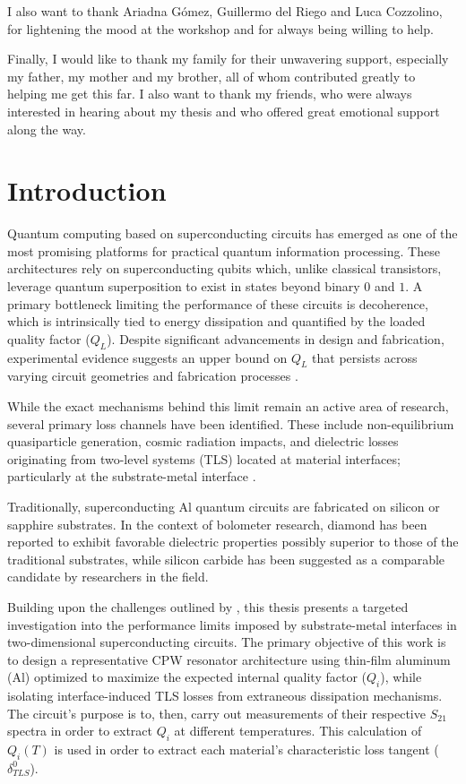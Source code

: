 \documentclass[12pt, a4paper]{article}
\begin{document}
I also want to thank Ariadna Gómez, Guillermo del Riego and Luca Cozzolino, for lightening the mood at the workshop and for always being willing to help.

Finally, I would like to thank my family for their unwavering support, especially my father, my mother and my brother, all of whom contributed greatly to helping me get this far. I also want to thank my friends, who were always interested in hearing about my thesis and who offered great emotional support along the way.

\newpage

\tableofcontents

\newpage

\section{Introduction}

Quantum computing based on superconducting circuits has emerged as one of the most promising platforms for practical quantum information processing. These architectures rely on superconducting qubits which, unlike classical transistors, leverage quantum superposition to exist in states beyond binary $0$ and $1$. A primary bottleneck limiting the performance of these circuits is decoherence, which is intrinsically tied to energy dissipation and quantified by the loaded quality factor ($Q_L$). Despite significant advancements in design and fabrication, experimental evidence suggests an upper bound on $Q_L$ that persists across varying circuit geometries and fabrication processes \cite{Charpentier2025}.

While the exact mechanisms behind this limit remain an active area of research, several primary loss channels have been identified. These include non-equilibrium quasiparticle generation, cosmic radiation impacts, and dielectric losses originating from two-level systems (TLS) located at material interfaces; particularly at the substrate-metal interface \cite{Charpentier2025}.

Traditionally, superconducting Al quantum circuits are fabricated on silicon or sapphire substrates. In the context of bolometer research, diamond has been reported to exhibit favorable dielectric properties \cite{Canonica2020a} possibly superior to those of the traditional substrates, while silicon carbide has been suggested as a comparable candidate by researchers in the field.

Building upon the challenges outlined by \cite{Charpentier2025}, this thesis presents a targeted investigation into the performance limits imposed by substrate-metal interfaces in two-dimensional superconducting circuits. The primary objective of this work is to design a representative CPW resonator architecture using thin-film aluminum (Al) optimized to maximize the expected internal quality factor ($Q_i$), while isolating interface-induced TLS losses from extraneous dissipation mechanisms. The circuit's purpose is to, then, carry out measurements of their respective $S_{21}$ spectra in order to extract $Q_i$ at different temperatures. This calculation of $Q_i (T)$ is used in order to extract each material's characteristic loss tangent ($\delta^0_{TLS}$).
\end{document}

